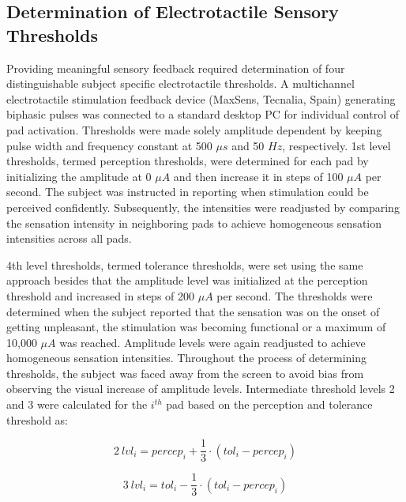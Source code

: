 
\subsection{Determination of Electrotactile Sensory Thresholds}


Providing meaningful sensory feedback required determination of four distinguishable subject specific electrotactile thresholds. A multichannel electrotactile stimulation feedback device (MaxSens, Tecnalia, Spain) generating biphasic pulses was connected to a standard desktop PC for individual control of pad activation. Thresholds were made solely amplitude dependent by keeping pulse width and frequency constant at 500 $\mu s$ and 50 $Hz$, respectively.  1st level thresholds, termed perception thresholds, were determined for each pad by initializing the amplitude at 0 $\mu A$ and then increase it in steps of 100 $\mu A$ per second. The subject was instructed in reporting when stimulation could be perceived confidently. Subsequently, the intensities were readjusted by comparing the sensation intensity in neighboring pads to achieve homogeneous sensation intensities across all pads. 

4th level thresholds, termed tolerance thresholds, were set using the same approach besides that the amplitude level was initialized at the perception threshold and increased in steps of 200 $\mu A$ per second. The thresholds were determined when the subject reported that the sensation was on the onset of getting unpleasant, the stimulation was becoming functional or a maximum of 10,000 $\mu A$ was reached. Amplitude levels were again readjusted to achieve homogeneous sensation intensities. Throughout the process of determining thresholds, the subject was faced away from the screen to avoid bias from observing the visual increase of amplitude levels. Intermediate threshold levels 2 and 3 were calculated for the $i^{th}$ pad based on the perception and tolerance threshold as: 

	\begin{equation}
	2~lvl_i = percep_i + \frac{1}{3} \cdot (tol_i - percep_i)
	\end{equation}

	\begin{equation}
	3~lvl_i = tol_i - \frac{1}{3} \cdot (tol_i - percep_i)
	\end{equation}
